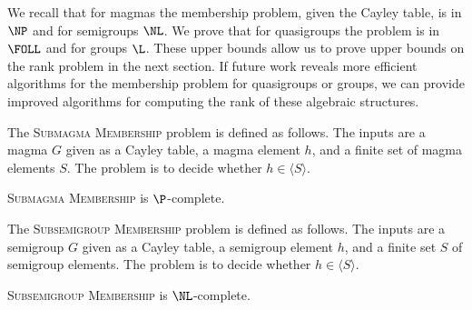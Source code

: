 \documentclass{article}
\newcommand{\gen}[1]{\langle #1 \rangle}
\begin{document}
%
We recall that for magmas the membership problem, given the Cayley table, is in $\NP$ and for semigroups $\NL$.
We prove that for quasigroups the problem is in $\FOLL$ and for groups $\L$.
These upper bounds allow us to prove upper bounds on the rank problem in the next section.
If future work reveals more efficient algorithms for the membership problem for quasigroups or groups, we can provide improved algorithms for computing the rank of these algebraic structures.

The \textsc{Submagma Membership} problem is defined as follows.
The inputs are a magma $G$ given as a Cayley table, a magma element $h$, and a finite set of magma elements $S$.
The problem is to decide whether $h \in \gen{S}$.

\begin{lemma}[{\autocite[Corollary~9]{jl76}}]\label{lem:submagmamem}
  \textsc{Submagma Membership} is $\P$-complete.
\end{lemma}


The \textsc{Subsemigroup Membership} problem is defined as follows.
The inputs are a semigroup $G$ given as a Cayley table, a semigroup element $h$, and a finite set $S$ of semigroup elements.
The problem is to decide whether $h \in \gen{S}$.

\begin{lemma}\label{lem:subsemigroupmem}
  \textsc{Subsemigroup Membership} is $\NL$-complete.
\end{lemma}
\end{document}
